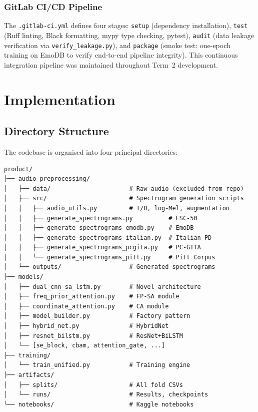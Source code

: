 \documentclass[oneside,openany]{final_report}
\begin{document}
\subsection{GitLab CI/CD Pipeline}

The \texttt{.gitlab-ci.yml} defines four stages: \texttt{setup} (dependency installation), \texttt{test} (Ruff linting, Black formatting, mypy type checking, pytest), \texttt{audit} (data leakage verification via \texttt{verify\_leakage.py}), and \texttt{package} (smoke test: one-epoch training on EmoDB to verify end-to-end pipeline integrity). This continuous integration pipeline was maintained throughout Term~2 development.

\chapter{Implementation}

\section{Directory Structure}

The codebase is organised into four principal directories:

\begin{verbatim}
product/
├── audio_preprocessing/
│   ├── data/                      # Raw audio (excluded from repo)
│   ├── src/                       # Spectrogram generation scripts
│   │   ├── audio_utils.py         # I/O, log-Mel, augmentation
│   │   ├── generate_spectrograms.py          # ESC-50
│   │   ├── generate_spectrograms_emodb.py    # EmoDB
│   │   ├── generate_spectrograms_italian.py  # Italian PD
│   │   ├── generate_spectrograms_pcgita.py   # PC-GITA
│   │   └── generate_spectrograms_pitt.py     # Pitt Corpus
│   └── outputs/                   # Generated spectrograms
├── models/
│   ├── dual_cnn_sa_lstm.py        # Novel architecture
│   ├── freq_prior_attention.py    # FP-SA module
│   ├── coordinate_attention.py    # CA module
│   ├── model_builder.py           # Factory pattern
│   ├── hybrid_net.py              # HybridNet
│   ├── resnet_bilstm.py           # ResNet+BiLSTM
│   └── [se_block, cbam, attention_gate, ...]
├── training/
│   └── train_unified.py           # Training engine
├── artifacts/
│   ├── splits/                    # All fold CSVs
│   └── runs/                      # Results, checkpoints
└── notebooks/                     # Kaggle notebooks
\end{verbatim}
\end{document}
